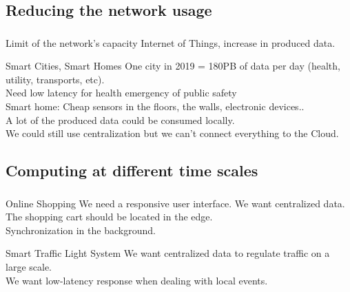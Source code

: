 \documentclass[utf8,xcolor=table, page number]{earlywinter}
\begin{document}
\subsection{Reducing the network usage}
\begin{frame}
  \frametitle{\secname}
  \framesubtitle{\subsecname}

  \begin{alertblock}{Limit of the network's capacity}
    Internet of Things, increase in produced data.%
  \end{alertblock}
  \vfill
  \begin{exampleblock}{Smart Cities, Smart Homes}
    One city in 2019 = 180PB of data per day (health, utility, transports, etc).\\
    Need low latency for health emergency of public safety \\
    Smart home: Cheap sensors in the floors, the walls, electronic devices..\\
    A lot of the produced data could be consumed locally.\\
    We could still use centralization but we can't connect everything to the Cloud.
  \end{exampleblock}
  
\end{frame}


\subsection{Computing at different time scales}
\begin{frame}
  \frametitle{\secname}
  \framesubtitle{\subsecname}

  \begin{exampleblock}{Online Shopping}
    We need a responsive user interface. We want centralized data.\\
    The shopping cart should be located in the edge.\\
    Synchronization in the background.
  \end{exampleblock}
  \vfill
  \begin{exampleblock}{Smart Traffic Light System}
    We want centralized data to regulate traffic on a large scale.\\
    We want low-latency response when dealing with local events.

  \end{exampleblock}
  
%  
\end{frame}
\end{document}
